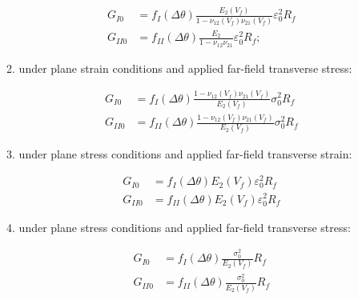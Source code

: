 \documentclass[review]{elsarticle}
\begin{document}
\begin{itemize}
\begin{enumerate}
\begin{equation}\label{eq:Gcircularcrack1}
\begin{aligned}
G_{I0}&=f_{I}\left(\Delta\theta\right)\frac{E_{2}\left(V_{f}\right)}{1-\nu_{12}\left(V_{f}\right)\nu_{21}\left(V_{f}\right)}\varepsilon_{0}^{2}R_{f}\\G_{II0}&=f_{II}\left(\Delta\theta\right)\frac{E_{2}}{1-\nu_{12}\nu_{21}}\varepsilon_{0}^{2}R_{f};
\end{aligned}
\end{equation}

\item under plane strain conditions and applied far-field transverse stress:

\begin{equation}\label{eq:Gcircularcrack2}
\begin{aligned}
G_{I0}&=f_{I}\left(\Delta\theta\right)\frac{1-\nu_{12}\left(V_{f}\right)\nu_{21}\left(V_{f}\right)}{E_{2}\left(V_{f}\right)}\sigma_{0}^{2}R_{f}\\G_{II0}&=f_{II}\left(\Delta\theta\right)\frac{1-\nu_{12}\left(V_{f}\right)\nu_{21}\left(V_{f}\right)}{E_{2}\left(V_{f}\right)}\sigma_{0}^{2}R_{f}
\end{aligned}
\end{equation}

\item under plane stress conditions and applied far-field transverse strain:

\begin{equation}\label{eq:Gcircularcrack3}
\begin{aligned}
G_{I0}&=f_{I}\left(\Delta\theta\right)E_{2}\left(V_{f}\right)\varepsilon_{0}^{2}R_{f}\\G_{II0}&=f_{II}\left(\Delta\theta\right)E_{2}\left(V_{f}\right)\varepsilon_{0}^{2}R_{f}
\end{aligned}
\end{equation}

\item under plane stress conditions and applied far-field transverse stress:

\begin{equation}\label{eq:Gcircularcrack4}
\begin{aligned}
G_{I0}&=f_{I}\left(\Delta\theta\right)\frac{\sigma_{0}^{2}}{E_{2}\left(V_{f}\right)}R_{f}\\G_{II0}&=f_{II}\left(\Delta\theta\right)\frac{\sigma_{0}^{2}}{E_{2}\left(V_{f}\right)}R_{f}
\end{aligned}
\end{equation}
\end{enumerate}


\end{itemize}
\end{document}
